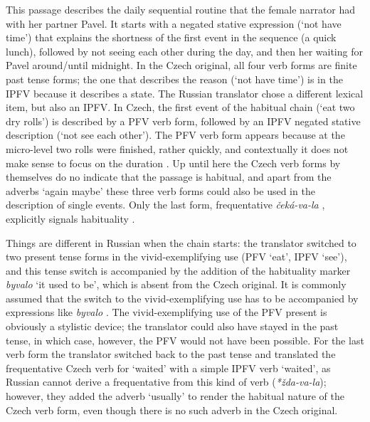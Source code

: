 \documentclass[output=paper,colorlinks,citecolor=brown]{langscibook}
\begin{document}
\noindent This passage describes the daily sequential routine that the female narrator had with her partner Pavel. It starts with a negated stative expression (`not have time') that explains the shortness of the first event in the sequence (a quick lunch), followed by not seeing each other during the day, and then her waiting for Pavel around/until midnight. In the Czech original, all four verb forms are finite past tense forms; the one that describes the reason (`not have time') is in the IPFV because it describes a state. The Russian translator chose a different lexical item, but also an IPFV. In Czech, the first event of the habitual chain (`eat two dry rolls') is described by a PFV verb form, followed by an IPFV negated stative description (`not see each other'). The PFV verb form appears because at the micro-level two rolls were finished, rather quickly, %
and %
contextually it does not make sense to focus on the duration%
. Up until here the Czech verb forms by themselves do no indicate that the passage is habitual, and apart from the adverbs `again maybe' %
these three verb forms could also be used in the description of single events. Only the last form, frequentative \textit{čeká-va-la}%
, explicitly signals habituality%
. 

Things are different in Russian when the chain starts: the translator switched to two present tense forms in the vivid-exemplifying use (PFV `eat', IPFV `see'), and this tense switch is accompanied by the addition of the habituality marker \textit{byvalo} `it used to be', which is absent from the Czech original. It is commonly assumed that the switch to the vivid-exemplifying use %
has to be accompanied by expressions like \textit{byvalo} %
\citep[see, e.g.][]{zaliznjaksmelev97}. The vivid-exemplifying use of the PFV present is obviously a stylistic device; the translator could also have stayed in the past tense, in which case, however, the PFV would not have been possible. For the last verb form the translator switched back to the past tense and translated the frequentative Czech verb for `waited' with a simple IPFV verb `waited', as Russian cannot derive a frequentative from this kind of verb (\textit{*žda-va-la}); however, they added the adverb `usually' to render the habitual nature of the Czech verb form, even though there is no such adverb in the Czech original.
\end{document}
